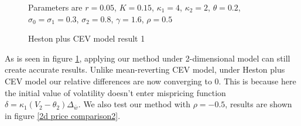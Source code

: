 \begin{figure}[ht]
  \hfill
  \caption{Heston plus CEV model result 1}
  \small{Parameters are $r=0.05$, $K=0.15$, $\kappa_1=4$, $\kappa_2=2$, $\theta=0.2$, $\sigma_0=\sigma_1=0.3$, $\sigma_2=0.8$, $\gamma=1.6$, $\rho=0.5$}
  \label{2d price comparison1}
\end{figure}

As is seen in figure \ref{2d price comparison1}, applying our method under 2-dimensional model can still create accurate results. Unlike mean-reverting CEV model, under Heston plus CEV model our relative differences are now converging to 0. This is because here the initial value of volatility doesn't enter mispricing function $\delta = \kappa_1(V_2-\theta_2) \Delta_{\bar{w}}$. We also test our method with $\rho=-0.5$, results are shown in figure \ref{2d price comparison2}.

